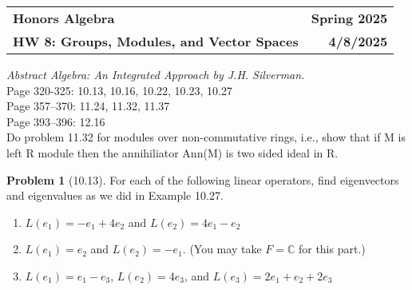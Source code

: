 \documentclass[12pt]{article}
\theoremstyle{definition}
\newtheorem{problem}{Problem}
\newcommand{\hwnum}{8}
\newcommand{\duedate}{4/8/2025}
\renewcommand{\title}{Groups, Modules, and Vector Spaces}
\begin{document}
\hspace{-10px}
\begin{tabular*}{\textwidth}{l @{\extracolsep{\fill}} r}
    \textbf{Honors Algebra} & \textbf{Spring 2025} \\
    \textbf{HW \hwnum : \title} &  \textbf{\duedate} \\
\end{tabular*}

\vspace{1cm}

\textit{Abstract Algebra: An Integrated Approach by J.H. Silverman.}\\
Page 320-325: 10.13, 10.16, 10.22, 10.23, 10.27\\
Page 357–370: 11.24, 11.32, 11.37\\
Page 393–396: 12.16\\
Do problem 11.32 for modules over non-commutative rings, i.e., show that 
if M is left R module then the annihiliator Ann(M) is two sided ideal in R.


\vspace{1cm}





\begin{problem}[10.13]
    For each of the following linear operators, find eigenvectors and eigenvalues as we did in Example 10.27. 
    \begin{enumerate}[label=(\alph*)]
        \item $L(e_1) = -e_1 + 4e_2$ and $L(e_2) = 4e_1 - e_2$
        \begin{solution}

        \end{solution}

        \item $L(e_1) = e_2$ and $L(e_2) = -e_1$. (You may take $F = \mathbb{C}$ for this part.)
        \begin{solution}

        \end{solution}

        \item $L(e_1) = e_1 - e_3$, $L(e_2) = 4e_3$, and $L(e_3) = 2e_1 + e_2 + 2e_3$
        \begin{solution}

        \end{solution}
    \end{enumerate}
\end{problem}
\end{document}
